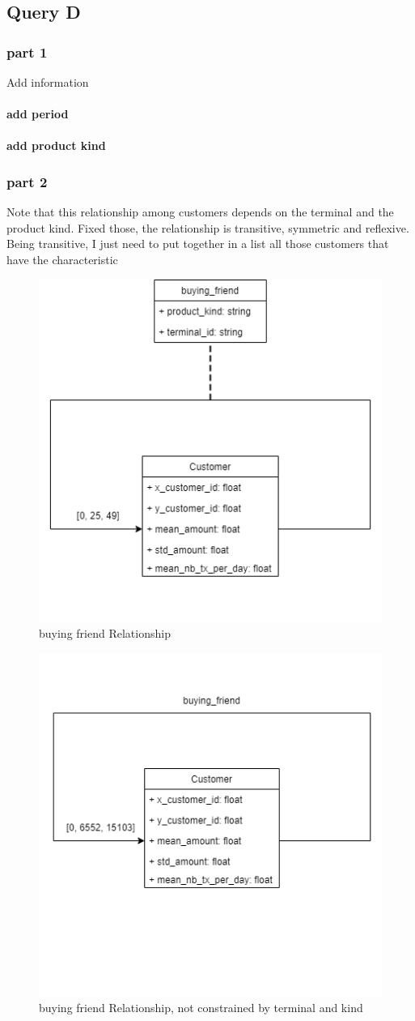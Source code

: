 \documentclass[runningheads]{llncs}
\begin{document}
\subsection{Query D}
\subsubsection{part 1}
Add information
\paragraph{add period}
\paragraph{add product kind}
\subsubsection{part 2}
Note that this relationship among customers depends on the terminal and the product kind. Fixed those, the relationship is transitive, symmetric and reflexive.\\
Being transitive, I just need to put together in a list all those customers that have the characteristic\\
\begin{figure}[!htb] 
        \centering \includegraphics[width=0.5\columnwidth]{images/buyingFriends_base.png}
        \caption{\label{fig4}buying friend Relationship}
\end{figure}
\begin{figure}[!htb] 
        \centering \includegraphics[width=0.5\columnwidth]{images/buyingFriends_all.png}
        \caption{\label{fig4}buying friend Relationship, not constrained by terminal and kind}
\end{figure}
\end{document}
